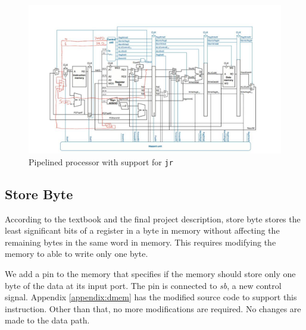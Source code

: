 \documentclass[titlepage,12pt,oneside,a4paper]{article}
\newcommand{\code}[1]{{\texttt{#1}}}
\begin{document}
\begin{figure}
	\includegraphics[width=\textwidth]{jr.jpeg}
	\centering
	\caption{Pipelined processor with support for \code{jr}}
	\label{fig:jr}
\end{figure}

\subsection{Store Byte}
According to the textbook and the final project description, store byte stores the least significant bits of a register in a byte in memory without affecting the remaining bytes in the same word in memory. This requires modifying the memory to able to write only one byte.

We add a pin to the memory that specifies if the memory should store only one byte of the data at its input port. The pin is connected to \textit{sb}, a new control signal. Appendix \ref{appendix:dmem} has the modified source code to support this instruction. Other than that, no more modifications are required. No changes are made to the data path.
\end{document}
